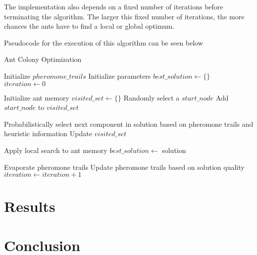 \documentclass{article}
\begin{document}
The implementation also depends on a fixed number of iterations before terminating the algorithm. The larger this fixed number of iterations, the more chances the ants have to find a local or global optimum.

Pseudocode for the execution of this algorithm can be seen below
\begin{algorithm}[!h]
    \DontPrintSemicolon
    \caption{Ant Colony Optimization}
    \label{alg:aco}
    \KwResult{}

    Initialize $pheromone\_trails$\;
    Initialize parameters\;
    $best\_solution\gets\{\}$\;
    $iteration\gets0$\;
    {
        {
            Initialize ant memory\;
            $visited\_set\gets\{\}$\;
            Randomly select a $start\_node$\;
            Add $start\_node$ to $visited\_set$\;

            {
                Probabilistically select next component in solution based on pheromone trails and heuristic information\;
                Update $visited\_set$\;
            }
        
            Apply local search to ant memory\;
            {
                $best\_solution\gets$ solution\;
            }
        }
        Evaporate pheromone trails\;
        Update pheromone trails based on solution quality\;
        $iteration\gets iteration + 1$
    }
    
\end{algorithm}
\newpage

\section{Results}
\section{Conclusion}

\pagebreak
\nocite*{}

\end{document}
